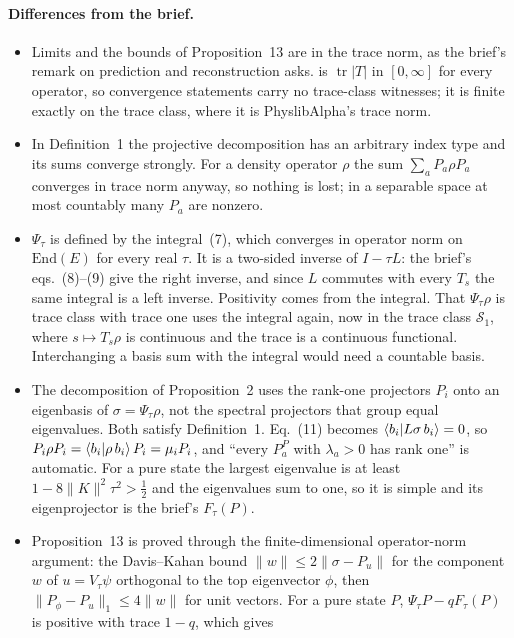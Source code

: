 \documentclass[11pt]{article}
\begin{document}
\paragraph{Differences from the brief.}
\begin{itemize}
\item Limits and the bounds of Proposition~13 are in the trace norm, as the brief's remark on
  prediction and reconstruction asks.  is $\operatorname{tr}|T|$ in $[0,\infty]$
  for every operator, so convergence statements carry no trace-class witnesses; it is finite
  exactly on the trace class, where it is PhyslibAlpha's trace norm.
\item In Definition~1 the projective decomposition has an arbitrary index type and its sums
  converge strongly. For a density operator $\rho$ the sum $\sum_a P_a\rho P_a$ converges in trace
  norm anyway, so nothing is lost; in a separable space at most countably many $P_a$ are nonzero.
\item $\Psi_\tau$ is defined by the integral~(7), which converges in operator norm on
  $\mathrm{End}(E)$ for every real $\tau$. It is a two-sided inverse of $I - \tau L$: the brief's
  eqs.~(8)--(9) give the right inverse, and since $L$ commutes with every $T_s$ the same integral
  is a left inverse. Positivity comes from the integral. That $\Psi_\tau\rho$ is trace class with
  trace one uses the integral again, now in the trace class $\mathcal{S}_1$, where
  $s \mapsto T_s\rho$ is continuous and the trace is a continuous functional. Interchanging a
  basis sum with the integral would need a countable basis.
\item The decomposition of Proposition~2 uses the rank-one projectors $P_i$ onto an eigenbasis of
  $\sigma = \Psi_\tau\rho$, not the spectral projectors that group equal eigenvalues. Both satisfy
  Definition~1. Eq.~(11) becomes $\braket{b_i|L\sigma\,b_i} = 0$, so
  $P_i\rho P_i = \braket{b_i|\rho\,b_i}P_i = \mu_iP_i$, and ``every $P_a^P$ with $\lambda_a > 0$ has
  rank one'' is automatic. For a pure state the largest eigenvalue is at least
  $1 - 8\|K\|^2\tau^2 > \frac12$ and the eigenvalues sum to one, so it is simple and its
  eigenprojector is the brief's $F_\tau(P)$.
\item Proposition~13 is proved through the finite-dimensional operator-norm argument: the
  Davis--Kahan bound $\|w\| \le 2\|\sigma - P_u\|$ for the component $w$ of $u = V_\tau\psi$
  orthogonal to the top eigenvector $\phi$, then $\|P_\phi - P_u\|_1 \le 4\|w\|$ for unit vectors.
  For a pure state $P$, $\Psi_\tau P - qF_\tau(P)$ is positive with trace $1-q$, which gives

\end{itemize}
\end{document}
